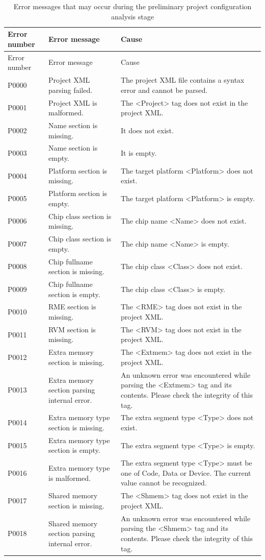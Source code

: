 \begin{xltabular}{\textwidth}{@{}>{\hsize\raggedright\arraybackslash}X>{\hsize\raggedright\arraybackslash}X>{\hsize\raggedright\arraybackslash}X@{}}
\caption{Error messages that may occur during the preliminary project configuration analysis stage}\label{tab:5-3}\\
\toprule
Error number & Error message & Cause\tabularnewline
\endfirsthead
\toprule
Error number & Error message & Cause\tabularnewline
\midrule
\endhead
\bottomrule
\endlastfoot
P0000 & Project XML parsing failed. &
The project XML file contains a syntax error and cannot be parsed.\tabularnewline
P0001 & Project XML is malformed. &
The <Project> tag does not exist in the project XML.\tabularnewline
P0002 & Name section is missing. & It does not exist.\tabularnewline
P0003 & Name section is empty. & It is empty.\tabularnewline
P0004 & Platform section is missing. &
The target platform <Platform> does not exist.\tabularnewline
P0005 & Platform section is empty. &
The target platform <Platform> is empty.\tabularnewline
P0006 & Chip class section is missing. &
The chip name <Name> does not exist.\tabularnewline
P0007 & Chip class section is empty. &
The chip name <Name> is empty.\tabularnewline
P0008 & Chip fullname section is missing. &
The chip class <Class> does not exist.\tabularnewline
P0009 & Chip fullname section is empty. &
The chip class <Class> is empty.\tabularnewline
P0010 & RME section is missing. &
The <RME> tag does not exist in the project XML.\tabularnewline
P0011 & RVM section is missing. &
The <RVM> tag does not exist in the project XML.\tabularnewline
P0012 & Extra memory section is missing. &
The <Extmem> tag does not exist in the project XML.\tabularnewline
P0013 & Extra memory section parsing internal error. &
An unknown error was encountered while parsing the <Extmem> tag and its contents. Please check the integrity of this tag.\tabularnewline
P0014 & Extra memory type section is missing. &
The extra segment type <Type> does not exist.\tabularnewline
P0015 & Extra memory type section is empty. &
The extra segment type <Type> is empty.\tabularnewline
P0016 & Extra memory type is malformed. &
The extra segment type <Type> must be one of Code, Data or Device. The current value cannot be recognized.\tabularnewline
P0017 & Shared memory section is missing. &
The <Shmem> tag does not exist in the project XML.\tabularnewline
P0018 & Shared memory section parsing internal error. &
An unknown error was encountered while parsing the <Shmem> tag and its contents. Please check the integrity of this tag.\tabularnewline

\end{xltabular}
